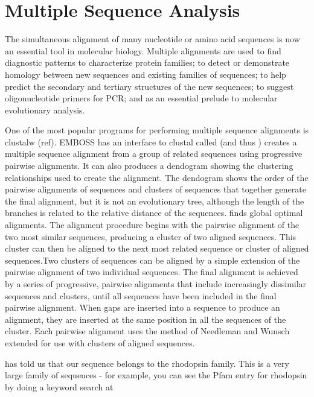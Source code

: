\documentclass[12pt]{report}
\begin{document}
\section{Multiple Sequence Analysis}
\label{sec:MSA}
The simultaneous alignment of many nucleotide or amino acid sequences
is now an essential tool in molecular biology.  Multiple alignments are
used to find diagnostic patterns to characterize protein families; to
detect or demonstrate homology between new sequences and existing
families of sequences; to help predict the secondary and tertiary
structures of the new sequences; to suggest oligonucleotide primers
for PCR; and as an essential prelude to molecular evolutionary
analysis.

One of the most popular programs for performing multiple sequence
alignments is clustalw (ref). EMBOSS has an interface to clustal
called 
 (and thus ) creates a 
multiple sequence alignment from a group of related sequences using
progressive pairwise alignments. It can also produces a dendogram
showing the clustering relationships used to create the alignment.
The dendogram shows the order of the pairwise alignments of sequences
and clusters of sequences that together generate the final alignment,
but it is not an evolutionary tree, although the length of the
branches is related to the relative distance of the sequences.
 finds global optimal alignments. The alignment 
procedure begins with the pairwise alignment of the two most similar
sequences, producing a cluster of two aligned sequences.  This cluster
can then be aligned to the next most related sequence or cluster of
aligned sequences.Two clusters of sequences can be aligned by a simple
extension of the pairwise alignment of two individual sequences.  The
final alignment is achieved by a series of progressive, pairwise
alignments that include increasingly dissimilar sequences and
clusters, until all sequences have been included in the final pairwise
alignment.  When gaps are inserted into a sequence to produce an
alignment, they are inserted at the same position in all the sequences
of the cluster. Each pairwise alignment uses the method of Needleman
and Wunsch extended for use with clusters of aligned sequences. 

 has told us that our sequence belongs to the 
rhodopsin family. This is a very large family of sequences - for
example, you can see the Pfam entry for rhodopsin by doing a keyword
search at\\
\end{document}
